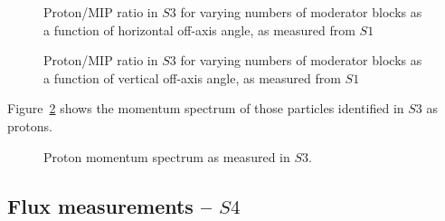 	\begin{figure}[ht]
		\begin{minipage}[t]{0.48\textwidth}
			\begin{adjustbox}{max totalsize={\textwidth}{.35\textheight}, center}
				
			\end{adjustbox}
			\caption{Proton/MIP ratio in $S3$ for varying numbers of moderator blocks as a function of horizontal off-axis angle, as measured from $S1$}
			\label{fig:propiratio_s3_horz}
		\end{minipage}
		\hspace{0.3cm}
		\begin{minipage}[t]{0.48\textwidth}
			\begin{adjustbox}{max totalsize={\textwidth}{.35\textheight}, center}
				
			\end{adjustbox}
			\caption{Proton/MIP ratio in $S3$ for varying numbers of moderator blocks as a function of vertical off-axis angle, as measured from $S1$}
			\label{fig:propiratio_s3_vert}
		\end{minipage}	
	\end{figure}

	Figure~\ref{fig:s3promom} shows the momentum spectrum of those particles identified in $S3$ as protons.

	\begin{figure}[ht]
		\centering
		\begin{adjustbox}{max totalsize={0.8\textwidth}, center}
			
		\end{adjustbox}
		\caption{Proton momentum spectrum as measured in $S3$.}
		\label{fig:s3promom}
	\end{figure}

	\subsection{Flux measurements -- $S4$}

   
